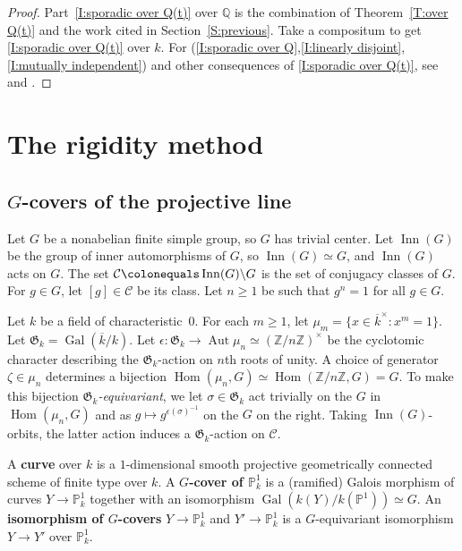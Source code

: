 \documentclass[12pt,reqno]{amsart}
\newcommand{\deficolor}{ForestGreen}
\newcommand{\defi}[1]{\textbf{\color{\deficolor} #1}} %
\newcommand{\PP}{\mathbb{P}}
\newcommand{\Q}{\mathbb{Q}}
\newcommand{\Z}{\mathbb{Z}}
\newcommand{\kbar}{{\overline{k}}}
\newcommand{\calC}{\mathcal{C}}
\newcommand{\GG}{\mathfrak{G}}
\DeclareMathOperator{\Aut}{Aut}
\DeclareMathOperator{\Gal}{Gal}
\DeclareMathOperator{\Hom}{Hom}
\DeclareMathOperator{\Inn}{Inn}
\newcommand{\isom}{\simeq}
\theoremstyle{definition}
\theoremstyle{remark}
\begin{document}
\begin{proof}
Part~\eqref{I:sporadic over Q(t)} over $\Q$ is the combination of Theorem~\ref{T:over Q(t)} and the work cited in Section~\ref{S:previous}.
Take a compositum to get \eqref{I:sporadic over Q(t)} over $k$.
For (\ref{I:sporadic over Q},\ref{I:linearly disjoint},\ref{I:mutually independent}) and other consequences of \eqref{I:sporadic over Q(t)}, see \cite[\S3.3--3.4]{Serre1992} and \cite[\S10.1]{Serre1997}.
\end{proof}

\section{The rigidity method}

\subsection{\texorpdfstring{$G$}{G}-covers of the projective line}

Let $G$ be a nonabelian finite simple group, so $G$ has trivial center.
Let $\Inn(G)$ be the group of inner automorphisms of $G$, so $\Inn(G) \isom G$, and $\Inn(G)$ acts on $G$.
The set $\calC \colonequals \Inn(G) \backslash G$ is the set of conjugacy classes of $G$.
For $g \in G$, let $[g] \in \calC$ be its class.
Let $n \ge 1$ be such that $g^n=1$ for all $g \in G$.

Let $k$ be a field of characteristic~$0$.
For each $m \ge 1$, let $\mu_m = \{x \in \kbar^\times : x^m=1\}$.
Let $\GG_k = \Gal(\kbar/k)$.
Let $\epsilon \colon \GG_k \to \Aut \mu_n \isom (\Z/n\Z)^\times$ be the cyclotomic character describing the $\GG_k$-action on $n$th roots of unity.
A choice of generator $\zeta \in \mu_n$ determines a bijection $\Hom(\mu_n,G) \isom \Hom(\Z/n\Z,G) = G$.
To make this bijection \emph{$\GG_k$-equivariant}, we let $\sigma \in \GG_k$ act trivially on the $G$ in $\Hom(\mu_n,G)$ and as $g \mapsto g^{\epsilon(\sigma)^{-1}}$ on the $G$ on the right.
Taking $\Inn(G)$-orbits, the latter action induces a $\GG_k$-action on $\calC$.

A \defi{curve} over $k$ is a $1$-dimensional smooth projective geometrically connected scheme of finite type over $k$.
A \defi{$G$-cover of $\PP^1_k$} is a (ramified) Galois morphism of curves $Y \to \PP^1_k$ together with an isomorphism $\Gal(k(Y)/k(\PP^1)) \isom G$.
An \defi{isomorphism of $G$-covers} $Y \to \PP^1_k$ and 
$Y' \to \PP^1_k$ is a $G$-equivariant isomorphism $Y \to Y'$ over $\PP^1_k$.
\end{document}
